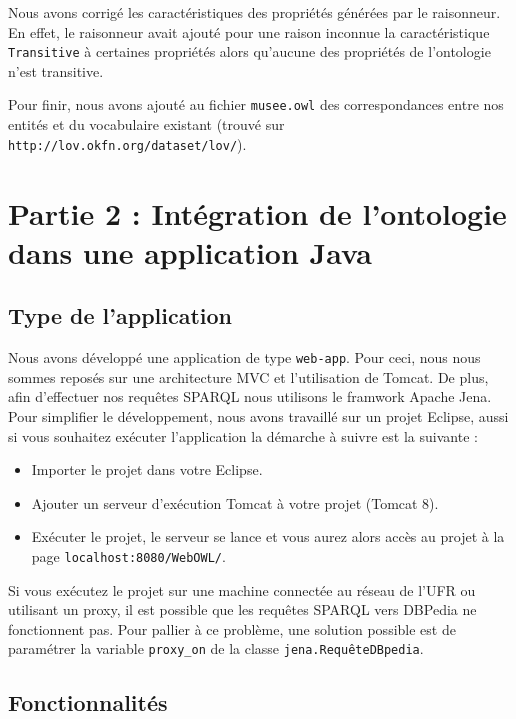 \documentclass{article}
\begin{document}
\vspace{0.3cm}

Nous avons corrigé les caractéristiques des propriétés générées par
le raisonneur. En effet, le raisonneur avait ajouté pour une raison inconnue la
caractéristique \texttt{Transitive} à certaines propriétés alors qu'aucune des
propriétés de l'ontologie n'est transitive.

\vspace{0.3cm}

Pour finir, nous avons ajouté au fichier \texttt{musee.owl} des correspondances
entre nos entités et du vocabulaire existant (trouvé sur
\texttt{http://lov.okfn.org/dataset/lov/}).


\section{Partie 2 : Intégration de l'ontologie dans une application Java}

\subsection{Type de l'application}

Nous avons développé une application de type \texttt{web-app}. Pour ceci, nous
nous sommes reposés sur une architecture MVC et l'utilisation de Tomcat. De plus,
afin d'effectuer nos requêtes SPARQL nous utilisons le framwork Apache Jena.
Pour simplifier le développement, nous avons travaillé sur un projet Eclipse,
aussi si vous souhaitez exécuter l'application la démarche à suivre est la
suivante :
\begin{itemize}
  \item Importer le projet dans votre Eclipse.
  \item Ajouter un serveur d'exécution Tomcat à votre projet (Tomcat 8).
  \item Exécuter le projet, le serveur se lance et vous aurez alors accès au
  projet à la page \texttt{localhost:8080/WebOWL/}.
\end{itemize}
Si vous exécutez le projet sur une machine connectée au réseau de l'UFR ou
utilisant un proxy, il est possible que les requêtes SPARQL vers DBPedia ne
fonctionnent pas. Pour pallier à ce problème, une solution possible est de
paramétrer la variable \texttt{proxy\_on} de la classe
\texttt{jena.RequêteDBpedia}.

\subsection{Fonctionnalités}
\end{document}
